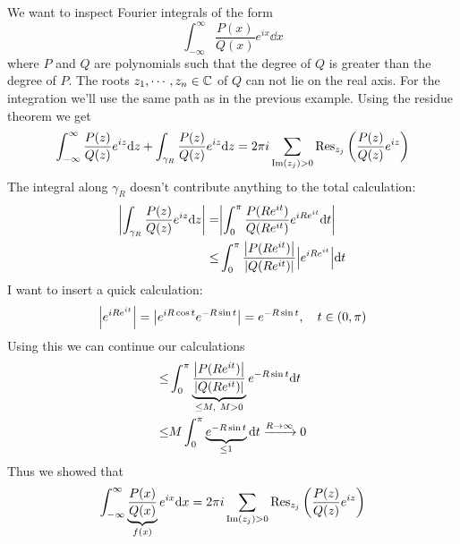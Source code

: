 \documentclass[../../script.tex]{subfiles}
\begin{document}
\begin{eg}
    We want to inspect Fourier integrals of the form 
    \[
        \int_{-\infty}^{\infty} \frac{P(x)}{Q(x)} e^{ix} \dd x
    \]
    where $P$ and $Q$ are polynomials such that the degree of $Q$ is greater than the degree of $P$.
    The roots $z_1, \cdots, z_n \in \mathbb{C}$ of $Q$ can not lie on the real axis. For the integration we'll use the same path as in the previous example.
    Using the residue theorem we get 
    \[
        \int_{-\infty}^{\infty} \frac{P(z)}{Q(z)} e^{iz} \dd z + \int_{\gamma_R} \frac{P(z)}{Q(z)} e^{iz} \dd z = 2\pi i \sum_{\Im(z_j) > 0} \Res_{z_j} \left(\frac{P(z)}{Q(z)} e^{iz}\right)
    \]
    The integral along $\gamma_R$ doesn't contribute anything to the total calculation:
    \begin{align*}
        \abs{\int_{\gamma_R} \frac{P(z)}{Q(z)} e^{iz} \dd z} = &\abs{\int_0^{\pi} \frac{P(Re^{it})}{Q(Re^{it})} e^{iRe^{it}} \dd t} \\
        \le &\int_0^{\pi} \frac{\abs{P(Re^{it})}}{\abs{Q(Re^{it})}} \abs{e^{iRe^{it}}} \dd t
    \end{align*}
    I want to insert a quick calculation:
    \[
        \abs{e^{iRe^{it}}} = \abs{e^{iR \cos t} e^{-R \sin t}} = e^{-R \sin t}, \quad t \in (0, \pi)
    \]
    Using this we can continue our calculations
    \begin{align*}
        \le & \int_0^{\pi} \underbrace{\frac{\abs{P(Re^{it})}}{\abs{Q(Re^{it})}}}_{\le M, ~M > 0} e^{-R \sin t} \dd t \\
        \le & M \int_0^{\pi} \underbrace{e^{-R \sin t}}_{\le 1} \dd t \conv{R \rightarrow \infty} 0
    \end{align*}
    Thus we showed that 
    \begin{align*}
        \int_{-\infty}^{\infty} \underbrace{\frac{P(x)}{Q(x)}}_{f(x)} e^{ix} \dd x = 2\pi i \sum_{\Im(z_j) > 0} \Res_{z_j} \left(\frac{P(z)}{Q(z)} e^{iz}\right)
    \end{align*}
\end{eg}
\end{document}
